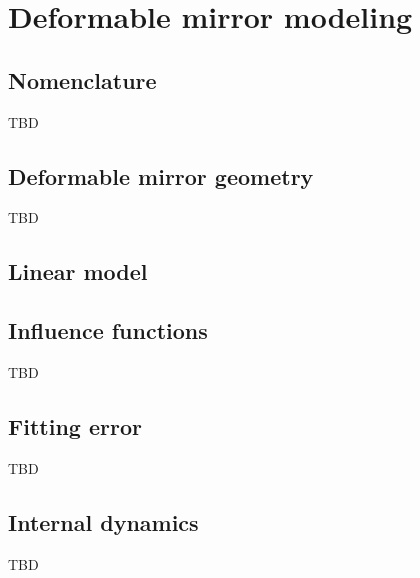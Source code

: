 
\newpage
\section{Deformable mirror modeling}
\label{sec:dm}


\subsection{Nomenclature}

TBD

\subsection{Deformable mirror geometry}
\label{subsec:dm-geometry}

TBD

\subsection{Linear model}
\label{subsec:dm-linear-model}


\subsection{Influence functions}
\label{subsec:dm-influence}

TBD

\subsection{Fitting error}
\label{subsec:dm-fitting-error}

TBD

\subsection{Internal dynamics}
\label{subsec:dm-dynamics}

TBD